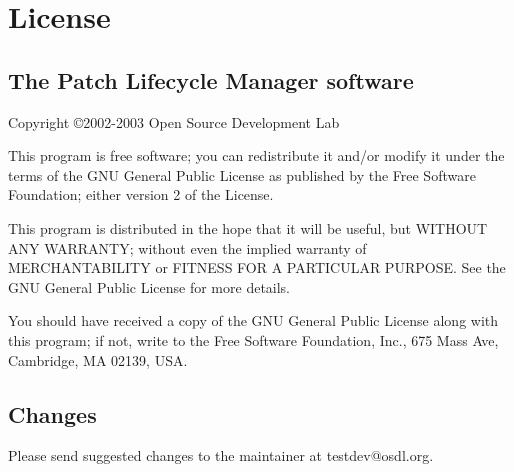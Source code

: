 \section{License}
\subsection{The Patch Lifecycle Manager software}
Copyright \copyright 2002-2003 Open Source Development Lab

This program is free software; you can redistribute it and/or modify
it under the terms of the GNU General Public License as published by
the Free Software Foundation; either version 2 of the License.

This program is distributed in the hope that it will be useful,
but WITHOUT ANY WARRANTY; without even the implied warranty of
MERCHANTABILITY or FITNESS FOR A PARTICULAR PURPOSE.  See the
GNU General Public License for more details.

You should have received a copy of the GNU General Public License
along with this program; if not, write to the Free Software
Foundation, Inc., 675 Mass Ave, Cambridge, MA 02139, USA.

\subsection{Changes}
Please send suggested changes to the maintainer at testdev@osdl.org.
